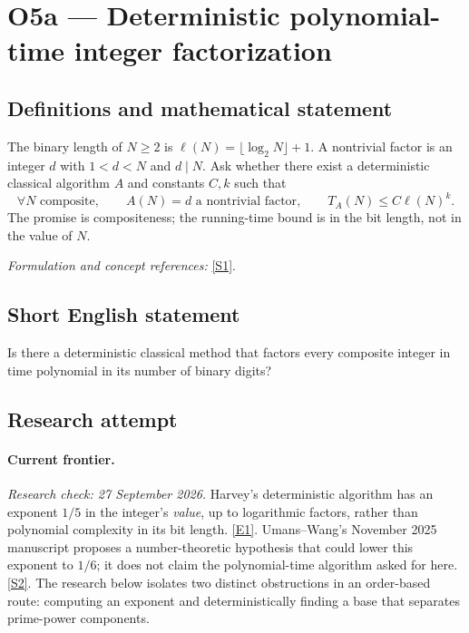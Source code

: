 \documentclass[11pt,a4paper]{article}
\newcommand{\sref}[2]{\hyperlink{source:#1:#2}{[S#2]}}
\newcommand{\eref}[2]{\hyperlink{extra:#1:#2}{[E#2]}}
\newif\ifshowcatalogue
\newcommand{\cataloguescope}[1]{\ifshowcatalogue
 \paragraph{Exact scope in the supplied catalogue.}
 \begin{quote}\small #1\end{quote}\fi}
\begin{document}
\setcounter{section}{0}
\clearpage
\section*{\texorpdfstring{O5a — Deterministic polynomial-time integer factorization}{O5a — Deterministic polynomial-time integer factorization}}\label{statement}
\subsection{Definitions and mathematical statement}
The binary length of $N\ge2$ is $\ell(N)=\lfloor\log_2N\rfloor+1$. A nontrivial factor is an integer $d$ with $1<d<N$ and $d\mid N$. Ask whether there exist a deterministic classical algorithm $A$ and constants $C,k$ such that
\[
 \forall N\text{ composite},\qquad A(N)=d\text{ a nontrivial factor},\qquad
 T_A(N)\le C\ell(N)^k.
\]
The promise is compositeness; the running-time bound is in the bit length, not in the value of $N$.
\par\smallskip\textit{Formulation and concept references:} \sref{statement}{1}.
\cataloguescope{Determine whether there is a deterministic classical algorithm that, on input a composite integer N in binary, outputs a nontrivial factor of N in time polynomial in log N.}
\subsection{Short English statement}
Is there a deterministic classical method that factors every composite integer in time polynomial in its number of binary digits?
\subsection{Research attempt}
\paragraph{Current frontier.}
\textit{Research check: 27 September 2026.}
Harvey's deterministic algorithm has an exponent $1/5$ in the integer's
\emph{value}, up to logarithmic factors, rather than polynomial complexity
in its bit length. \eref{statement}{1}. Umans--Wang's November 2025 manuscript
proposes a number-theoretic hypothesis that could lower this exponent to
$1/6$; it does not claim the polynomial-time algorithm asked for here.
\sref{statement}{2}. The research below isolates two distinct obstructions in an
order-based route: computing an exponent and deterministically finding a
base that separates prime-power components.
\end{document}
